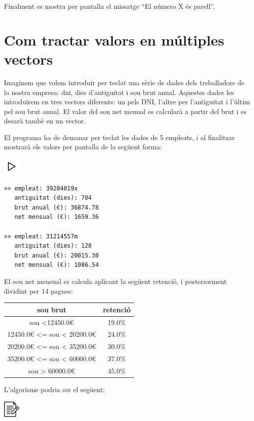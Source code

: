 \documentclass[]{book}
\newcommand{\euro}{€}
\begin{document}
Finalment es mostra per pantalla el missatge ``El número X és parell''.

\section{Com tractar valors en múltiples
vectors}\label{com-tractar-valors-en-multiples-vectors}

Imaginem que volem introduir per teclat una sèrie de dades dels
treballadors de la nostra empresa: dni, dies d'antiguitat i sou brut
anual. Aquestes dades les introduïrem en tres vectors diferents: un pels
DNI, l'altre per l'antiguitat i l'últim pel sou brut anual. El valor del
sou net menual es calcularà a partir del brut i es desarà també en un
vector.

El programa ha de demanar per teclat les dades de 5 empleats, i al
finalitzar mostrarà els valors per pantalla de la següent forma:

\includegraphics{./img/play.png}

\begin{verbatim}
>> empleat: 39284019x
   antiguitat (dies): 784
   brut anual (€): 36874.78
   net mensual (€): 1659.36

>> empleat: 31214557m
   antiguitat (dies): 128
   brut anual (€): 20015.30
   net mensual (€): 1086.54
\end{verbatim}

El sou net mensual es calcula aplicant la següent retenció, i
posteriorment dividint per 14 pagues:

\begin{longtable}[]{@{}cc@{}}
\toprule
sou brut & retenció\tabularnewline
\midrule
\endhead
sou \textless{}12450.0\euro{} & 19.0\%\tabularnewline
12450.0\euro{} \textless{}= sou \textless{} 20200.0\euro{} &
24.0\%\tabularnewline
20200.0\euro{} \textless{}= sou \textless{} 35200.0\euro{} &
30.0\%\tabularnewline
35200.0\euro{} \textless{}= sou \textless{} 60000.0\euro{} &
37.0\%\tabularnewline
sou \textgreater{} 60000.0\euro{} & 45.0\%\tabularnewline
\bottomrule
\end{longtable}

L'algorisme podria ser el següent:

\includegraphics{./img/alg.png}
\end{document}
